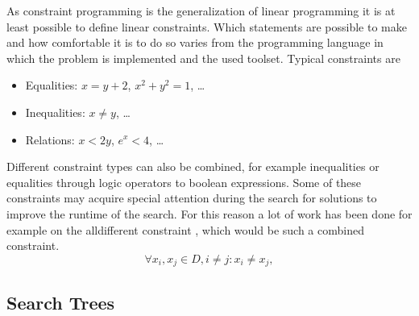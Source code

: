 \documentclass[10pt,
               a4paper,
               journal,
               ]{IEEEtran}
\begin{document}
	As constraint programming is the generalization of linear programming it is at least possible to define linear constraints. Which statements are possible to make and how comfortable it is to do so varies from the programming language in which the problem is implemented and the used toolset. Typical constraints are
	\begin{itemize}
		\item Equalities: $x = y + 2$, $x^2 + y^2 = 1$, \dots
		\item Inequalities: $x \ne y$, \dots
		\item Relations: $x < 2 y$, $e^x < 4$, \dots
	\end{itemize}
	
	Different constraint types can also be combined, for example inequalities or equalities through logic operators to boolean expressions. Some of these constraints may acquire special attention during the search for solutions to improve the runtime of the search. For this reason a lot of work has been done for example on the alldifferent constraint \cite{allDifferent}, which would be such a combined constraint.
	\begin{equation}
		\forall x_i, x_j \in D, i \ne j: x_i \ne x_j, 
		\label{eq:alldifferent}
	\end{equation}
	
	\subsection{Search Trees}
	
\end{document}
